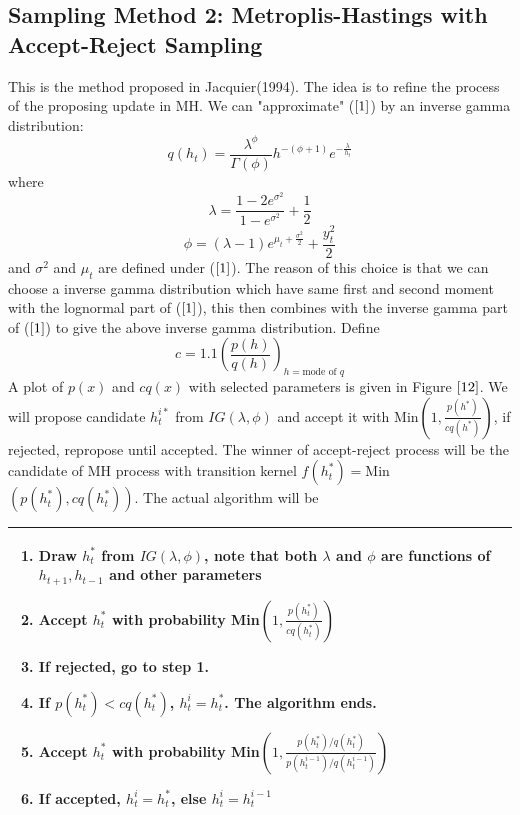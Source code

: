 \documentclass{article}
\begin{document}
\subsection{Sampling Method 2: Metroplis-Hastings with Accept-Reject Sampling}
This is the method proposed in Jacquier(1994). The idea is to refine the process of the proposing update in MH. We can "approximate" ($\ref{1}$)  by an inverse gamma distribution:
\[
q(h_t)=\frac{\lambda^\phi}{\Gamma(\phi)}h^{-(\phi+1)}e^{-\frac{\lambda}{h_t}}
\]
where
\[
\lambda=\frac{1-2e^{\sigma^2}}{1-e^{\sigma^2}}+\frac{1}{2}
\]
\[
\phi=(\lambda-1)e^{\mu_t+\frac{\sigma^2}{2}}+\frac{y_t^2}{2}
\]
and $\sigma^2$ and $\mu_t$ are defined under ($\ref{1}$). The reason of this choice is that we can choose a inverse gamma distribution which have same first and second moment with the lognormal part of ($\ref{1}$), this then combines with the inverse gamma part of ($\ref{1}$) to give the above inverse gamma distribution.
Define
\[
c=1.1\left(\frac{p(h)}{q(h)}\right)_{h=\textrm{mode of } q}
\]
A plot of $p(x)$ and $cq(x)$ with selected parameters is given in Figure $\ref{12}$. We will propose candidate $h^{i*}_t$ from $IG(\lambda,\phi)$ and accept it with Min$(1,\frac{p(h^*)}{cq(h^*)})$, if rejected, repropose until accepted. The winner of accept-reject process will be the candidate of MH process with transition kernel $f(h_t^*)=$Min$(p(h_t^*),cq(h_t^*))$. The actual algorithm will be

\begin{tabular}{|p{11cm}|}
\hline
\begin{enumerate}
\item
Draw $ h^*_t$ from $IG(\lambda,\phi)$, note that both $\lambda$ and $\phi$ are functions of $h_{t+1},h_{t-1}$ and other parameters
\item
Accept $h^*_t$ with probability Min$(1,\frac{p(h^*_t)}{cq(h^*_t)})$
\item
If rejected, go to step 1.
\item
If $p(h^*_t)<cq(h^*_t)$, $h^i_t=h^*_t$. The algorithm ends.
\item
Accept $h^*_t$ with probability Min$(1,\frac{p(h^*_t)/q(h^*_t)}{p(h^{i-1}_t)/q(h^{i-1}_t)})$
\item
If accepted,  $h^i_t=h^*_t$, else $h^i_t=h^{i-1}_t$
\end{enumerate}\\
\hline
\end{tabular}
\end{document}
